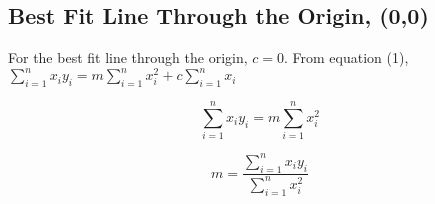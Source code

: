 \documentclass{article}
\begin{document}
\subsection{Best Fit Line Through the Origin, (0,0)}
For the best fit line through the origin, $c=0$. From equation (1), $\sum\limits_{i = 1}^n {{x_i}{y_i} = m\sum\limits_{i = 1}^n {x_i^2}  + c\sum\limits_{i = 1}^n {{x_i}} }$

$$\sum\limits_{i = 1}^n {{x_i}{y_i} = m\sum\limits_{i = 1}^n {x_i^2} } $$

\begin{equation}
m = \frac{{\sum\limits_{i = 1}^n {{x_i}{y_i}} }}{{\sum\limits_{i = 1}^n {x_i^2} }}
\end{equation}
\end{document}
